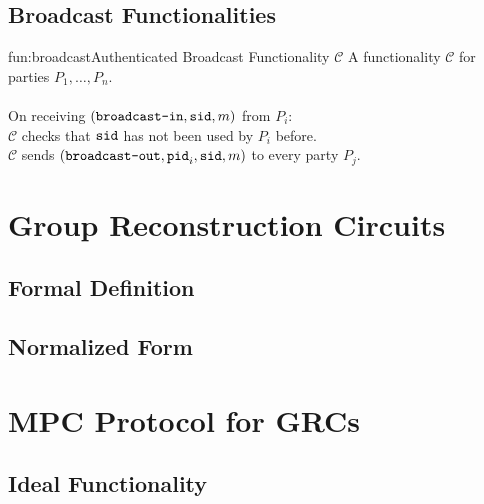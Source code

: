 \subsection{Broadcast Functionalities}

\begin{afunctionality}{fun:broadcast}{Authenticated Broadcast Functionality $\mathcal{C}$}
A functionality $\mathcal{C}$ for parties $P_1, \ldots, P_n$.\\
\\
On receiving $(\texttt{broadcast-in}, \texttt{sid}, m)$ from $P_i$:\\
$\mathcal{C}$ checks that $\texttt{sid}$ has not been used by $P_i$ before.\\
$\mathcal{C}$ sends $(\texttt{broadcast-out}, \texttt{pid}_i, \texttt{sid}, m)$ to every party $P_j$.
\end{afunctionality}

\section{Group Reconstruction Circuits}

\subsection{Formal Definition}

\subsection{Normalized Form}

\section{MPC Protocol for GRCs}

\subsection{Ideal Functionality}

